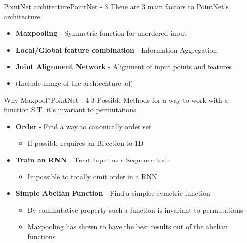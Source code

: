 \documentclass{beamer}
\begin{document}
		\begin{frame}{PointNet architecture}{PointNet - 3}
			There are 3 main factors to PointNet's architecture
			\begin{itemize}
				\item \textbf{Maxpooling} - Symmetric function for unordered input
				\item \textbf{Local/Global feature combination} - Information Aggregation
				\item \textbf{Joint Alignment Network} - Alignment of input points and features
				\item (Include image of the archtechture lol)
			\end{itemize}
		\end{frame}
		
		\begin{frame}{Why Maxpool?}{PointNet - 4}
			3 Possible Methods for a way to work with a function S.T. it's invariant to permutations
			\begin{itemize}
				\item \textbf{Order} - Find a way to canonically order set
				\begin{itemize}
					\item If possible requires an Bijection to 1D
				\end{itemize}
				\item \textbf{Train an RNN} - Treat Input as a Sequence train
				\begin{itemize}
					\item Impossible to totally omit order in a RNN
				\end{itemize}
				\item \textbf{Simple Abelian Function} - Find a simplee symetric function
				\begin{itemize}
					\item By commutative property such a function is invariant to permutations
					\item Maxpooling has shown to have the best results out of the abelian functions
				\end{itemize}
			\end{itemize}
		\end{frame}
	
\end{document}
